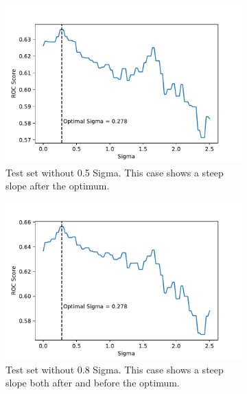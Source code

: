 \documentclass[12pt,a4paper]{report}
\begin{document}
\begin{figure}
\begin{subfigure}[b]{0.49\textwidth}
    \end{subfigure}
    ~ %
    \begin{subfigure}[b]{0.49\textwidth}
        \includegraphics[width=\textwidth]{imgs/180531_Sigma_fixed_test_05.pdf}
        \caption{Test set without 0.5 Sigma. This case shows a steep slope after the optimum.}
        \label{fig:}
    \end{subfigure}
    \begin{subfigure}[b]{0.49\textwidth}
        \includegraphics[width=\textwidth]{imgs/180531_Sigma_fixed_test_08.pdf}
        \caption{Test set without 0.8 Sigma. This case shows a steep slope both after and before the optimum.}
        \label{fig:}
    \end{subfigure}
        \begin{subfigure}[b]{0.49\textwidth}

\end{subfigure}
\end{figure}
\end{document}
